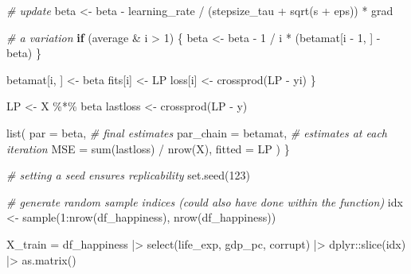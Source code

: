 \documentclass[
  letterpaper,
]{krantz}
\newenvironment{Shaded}{}{}
\newcommand{\AttributeTok}[1]{\textcolor[rgb]{0.49,0.56,0.16}{#1}}
\newcommand{\CommentTok}[1]{\textcolor[rgb]{0.38,0.63,0.69}{\textit{#1}}}
\newcommand{\ControlFlowTok}[1]{\textcolor[rgb]{0.00,0.44,0.13}{\textbf{#1}}}
\newcommand{\DecValTok}[1]{\textcolor[rgb]{0.25,0.63,0.44}{#1}}
\newcommand{\FunctionTok}[1]{\textcolor[rgb]{0.02,0.16,0.49}{#1}}
\newcommand{\NormalTok}[1]{#1}
\newcommand{\OtherTok}[1]{\textcolor[rgb]{0.00,0.44,0.13}{#1}}
\newcommand{\SpecialCharTok}[1]{\textcolor[rgb]{0.25,0.44,0.63}{#1}}
\begin{document}
\begin{Shaded}
\begin{Highlighting}[]
        \CommentTok{\# update}
\NormalTok{        beta }\OtherTok{\textless{}{-}}\NormalTok{ beta }\SpecialCharTok{{-}}\NormalTok{ learning\_rate }\SpecialCharTok{/}\NormalTok{ (stepsize\_tau }\SpecialCharTok{+} \FunctionTok{sqrt}\NormalTok{(s }\SpecialCharTok{+}\NormalTok{ eps)) }\SpecialCharTok{*}\NormalTok{ grad}

        \CommentTok{\# a variation}
        \ControlFlowTok{if}\NormalTok{ (average }\SpecialCharTok{\&}\NormalTok{ i }\SpecialCharTok{\textgreater{}} \DecValTok{1}\NormalTok{) \{}
\NormalTok{            beta }\OtherTok{\textless{}{-}}\NormalTok{ beta }\SpecialCharTok{{-}} \DecValTok{1} \SpecialCharTok{/}\NormalTok{ i }\SpecialCharTok{*}\NormalTok{ (betamat[i }\SpecialCharTok{{-}} \DecValTok{1}\NormalTok{, ] }\SpecialCharTok{{-}}\NormalTok{ beta)}
\NormalTok{        \}}

\NormalTok{        betamat[i, ] }\OtherTok{\textless{}{-}}\NormalTok{ beta}
\NormalTok{        fits[i] }\OtherTok{\textless{}{-}}\NormalTok{ LP}
\NormalTok{        loss[i] }\OtherTok{\textless{}{-}} \FunctionTok{crossprod}\NormalTok{(LP }\SpecialCharTok{{-}}\NormalTok{ yi)}
\NormalTok{    \}}

\NormalTok{    LP }\OtherTok{\textless{}{-}}\NormalTok{ X }\SpecialCharTok{\%*\%}\NormalTok{ beta}
\NormalTok{    lastloss }\OtherTok{\textless{}{-}} \FunctionTok{crossprod}\NormalTok{(LP }\SpecialCharTok{{-}}\NormalTok{ y)}

    \FunctionTok{list}\NormalTok{(}
        \AttributeTok{par =}\NormalTok{ beta, }\CommentTok{\# final estimates}
        \AttributeTok{par\_chain =}\NormalTok{ betamat, }\CommentTok{\# estimates at each iteration}
        \AttributeTok{MSE =} \FunctionTok{sum}\NormalTok{(lastloss) }\SpecialCharTok{/} \FunctionTok{nrow}\NormalTok{(X),}
        \AttributeTok{fitted =}\NormalTok{ LP}
\NormalTok{    )}
\NormalTok{\}}

\CommentTok{\# setting a seed ensures replicability}
\FunctionTok{set.seed}\NormalTok{(}\DecValTok{123}\NormalTok{)}

\CommentTok{\# generate random sample indices (could also have done within the function)}
\NormalTok{idx }\OtherTok{\textless{}{-}} \FunctionTok{sample}\NormalTok{(}\DecValTok{1}\SpecialCharTok{:}\FunctionTok{nrow}\NormalTok{(df\_happiness), }\FunctionTok{nrow}\NormalTok{(df\_happiness))}

\NormalTok{X\_train }\OtherTok{=}\NormalTok{ df\_happiness }\SpecialCharTok{|\textgreater{}}
    \FunctionTok{select}\NormalTok{(life\_exp, gdp\_pc, corrupt) }\SpecialCharTok{|\textgreater{}}
\NormalTok{    dplyr}\SpecialCharTok{::}\FunctionTok{slice}\NormalTok{(idx) }\SpecialCharTok{|\textgreater{}}
    \FunctionTok{as.matrix}\NormalTok{()}


\end{Highlighting}
\end{Shaded}
\end{document}
